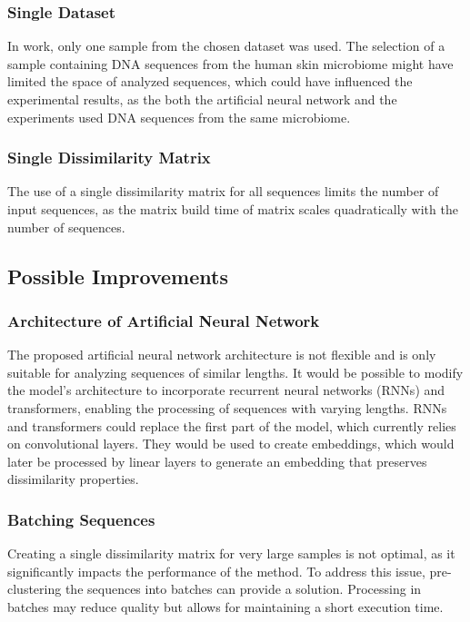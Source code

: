 \documentclass[pdflatex,sn-vancouver-num]{sn-jnl}%
\begin{document}
            \subsubsection{Single Dataset}
                In work, only one sample from the chosen dataset was used. The selection of a sample containing DNA sequences from the human skin microbiome might have limited the space of analyzed sequences, which could have influenced the experimental results, as the both the artificial neural network and the experiments used DNA sequences from the same microbiome.

            \subsubsection{Single Dissimilarity Matrix}
                The use of a single dissimilarity matrix for all sequences limits the number of input sequences, as the matrix build time of matrix scales quadratically with the number of sequences.

        \subsection{Possible Improvements}
            \subsubsection{Architecture of Artificial Neural Network}
                The proposed artificial neural network architecture is not flexible and is only suitable for analyzing sequences of similar lengths. It would be possible to modify the model's architecture to incorporate recurrent neural networks (RNNs) and transformers, enabling the processing of sequences with varying lengths. RNNs and transformers could replace the first part of the model, which currently relies on convolutional layers. They would be used to create embeddings, which would later be processed by linear layers to generate an embedding that preserves dissimilarity properties.

            \subsubsection{Batching Sequences}
                Creating a single dissimilarity matrix for very large samples is not optimal, as it significantly impacts the performance of the method. To address this issue, pre-clustering the sequences into batches can provide a solution. Processing in batches may reduce quality but allows for maintaining a short execution time.
\end{document}
